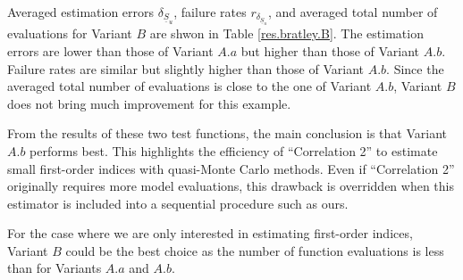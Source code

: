 Averaged estimation errors $\delta_{\underline{S}_u}$, failure rates $r_{\delta_{\underline{S}_u}}$, and averaged total number of evaluations for Variant $B$ are shwon in Table \ref{res.bratley.B}. The estimation errors are lower than those of Variant $A.a$ but higher than those of Variant $A.b$. Failure rates are similar but slightly higher than those of Variant $A.b$. Since the averaged total number of evaluations is close to the one of Variant $A.b$,  Variant $B$ does not bring much improvement for this example.
\bigskip

From the results of these two test functions, the main conclusion is that Variant $A.b$ performs best. This highlights the efficiency of ``Correlation 2'' to estimate small first-order indices with quasi-Monte Carlo methods. Even if ``Correlation 2'' originally requires more model evaluations, this drawback is overridden when this estimator is included into a sequential procedure such as ours. 

For the case where we are only interested in estimating first-order indices, Variant $B$ could be the best choice as the number of function evaluations is less than for Variants $A.a$ and $A.b$.


